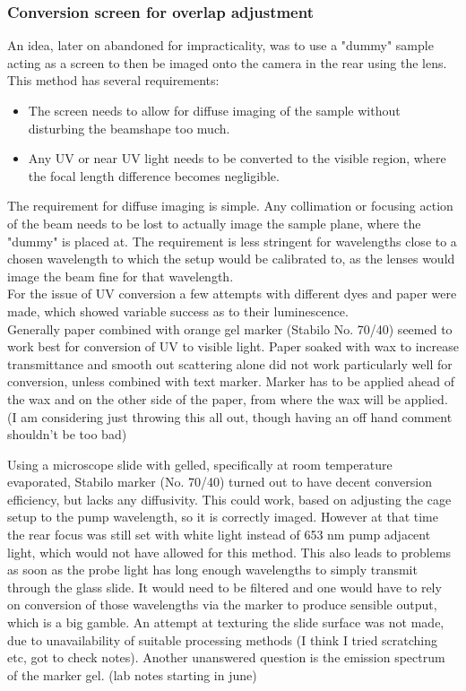 \documentclass[twoside,openright]{scrreprt}
\begin{document}
\subsubsection{Conversion screen for overlap adjustment}
An idea, later on abandoned for impracticality, was to use a "dummy" sample acting as a screen to then be imaged onto the camera in the rear using the lens. This method has several requirements:
\begin{itemize}
\item The screen needs to allow for diffuse imaging of the sample without disturbing the beamshape too much.
\item Any UV or near UV light needs to be converted to the visible region, where the focal length difference becomes negligible.
\end{itemize}

The requirement for diffuse imaging is simple. Any collimation or focusing action of the beam needs to be lost to actually image the sample plane, where the "dummy" is placed at. The requirement is less stringent for wavelengths close to a chosen wavelength to which the setup would be calibrated to, as the lenses would image the beam fine for that wavelength.\\

For the issue of UV conversion a few attempts with different dyes and paper were made, which showed variable success as to their luminescence.\\
Generally paper combined with orange gel marker (Stabilo No. 70/40) seemed to work best for conversion of UV to visible light.
Paper soaked with wax to increase transmittance and smooth out scattering alone did not work particularly well for conversion, unless combined with text marker. Marker has to be applied ahead of the wax and on the other side of the paper, from where the wax will be applied. (I am considering just throwing this all out, though having an off hand comment shouldn't be too bad) 

Using a microscope slide with gelled, specifically at room temperature evaporated, Stabilo marker (No. 70/40) turned out to have decent conversion efficiency, but lacks any diffusivity.  This could work, based on adjusting the cage setup to the pump wavelength, so it is correctly imaged. However at that time the rear focus was still set with white light instead of 653 nm pump adjacent light, which would not have allowed for this method. This also leads to problems as soon as the probe light has long enough wavelengths to simply transmit through the glass slide. It would need to be filtered and one would have to rely on conversion of those wavelengths via the marker to produce sensible output, which is a big gamble. An attempt at texturing the slide surface was not made, due to unavailability of suitable processing methods (I think I tried scratching etc, got to check notes). Another unanswered question is the emission spectrum of the marker gel. (lab notes  starting in june)\\
\end{document}

